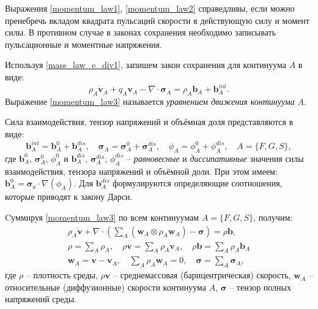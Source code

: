 	Выражения \eqref{momentum_law1}, \eqref{momentum_law2} справедливы, если можно пренебречь вкладом квадрата пульсаций скорости в действующую силу и момент силы. В противном случае в законах сохранения необходимо записывать пульсационные и моментные напряжения.

	Используя \eqref{mass_law_e_div1}, запишем закон сохранения для континуума $A$ в виде:
\begin{equation}
	\label{momentum_law3}
	\rho_A \dot{\boldsymbol{v}}_A + q_A \boldsymbol{v}_A - \nabla \cdot \boldsymbol{\sigma}_A = \rho_A\boldsymbol{b}_A + \boldsymbol{b}_A^{int}.
\end{equation}
	Выражение \eqref{momentum_law3} называется \textit{уравнением движения континуума} $A$.

	Сила взаимодействия, тензор напряжений и объёмная доля представляются в виде:
\begin{equation}
	\label{int_force}
	\boldsymbol{b}_A^{int} = \boldsymbol{b}_A^0 + \boldsymbol{b}_A^{dis}, 
	\quad \boldsymbol{\sigma}_A = \boldsymbol{\sigma}_A^0 + \boldsymbol{\sigma}_A^{dis}, 
	\quad \phi_A = \phi_A^0 + \phi_A^{dis},	
	\quad A = \{F, G, S\},
\end{equation}
	где $\boldsymbol{b}_A^0$, $\boldsymbol{\sigma}_A^0$, $\phi_A^0$ и $\boldsymbol{b}_A^{dis}$, $\boldsymbol{\sigma}_A^{dis}$, $\phi_A^{dis}$ -- \textit{равновесные} и \textit{диссипативные} значения силы взаимодействия, тензора напряжений и объёмной доли. При этом имеем: $\boldsymbol{b}_A^0 = \boldsymbol{\sigma}_a \cdot \nabla (\phi_A)$. Для $\boldsymbol{b}_A^{dis}$ формулируются определяющие соотношения, которые приводят к закону Дарси.
	
	Cуммируя \eqref{momentum_law3} по всем континуумам $A = \{F, G, S\}$, получим:
\begin{align}
	\label{momentum_law_full}
	\rho_A \dot{\boldsymbol{v}} + \nabla \cdot \left(\sum\limits_{A}\left(\boldsymbol{w}_A \otimes \rho_A\boldsymbol{w}_A\right) -\boldsymbol{\sigma}\right) = \rho \boldsymbol{b},\\
	\rho = \sum\limits_{A} \rho_A, \quad \rho\boldsymbol{v}=\sum\limits_{A}\rho_A\boldsymbol{v}_A, \quad 
	\rho\boldsymbol{b}=\sum\limits_{A}\rho_A\boldsymbol{b}_A\\
	\boldsymbol{w}_A = \boldsymbol{v} - \boldsymbol{v}_A, \quad \sum\limits_A \rho_A\boldsymbol{w}_A = 0, \quad
	\boldsymbol{\sigma} = \sum\limits_{A} \boldsymbol{\sigma}_A,
\end{align}
	где $\rho$ -- плотность среды, $\rho\boldsymbol{v}$ -- среднемассовая (барицентрическая) скорость,
	$\boldsymbol{w}_A$ -- относительные (диффузионные) скорости континуума $A$,
	$\boldsymbol{\sigma}$ -- тензор полных напряжений среды.
	
